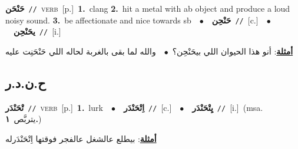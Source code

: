 \documentclass[10pt,a4paper,twoside]{article} %
\begin{document}
\begin{multicols}{2}
{\setlength\topsep{0pt}\textbf{\foreignlanguage{arabic}{حَنْحَن}}\ {\color{gray}\texttt{//}\color{black}}\ \textsc{verb}\ [p.]\ \textbf{1.}~clang  \textbf{2.}~hit a metal with ab object and produce a loud noisy sound.  \textbf{3.}~be affectionate and nice towards sb\ \ $\bullet$\ \ \setlength\topsep{0pt}\textbf{\foreignlanguage{arabic}{حَنْحِن}}\ {\color{gray}\texttt{//}\color{black}}\ [c.]\ \ $\bullet$\ \ \setlength\topsep{0pt}\textbf{\foreignlanguage{arabic}{يحَنْحِن}}\ {\color{gray}\texttt{//}\color{black}}\ [i.]\  \begin{flushright}\color{gray}\foreignlanguage{arabic}{\textbf{\underline{\foreignlanguage{arabic}{أمثلة}}}: أنو هذا الحيوان اللي بيحَنْحِن؟\ $\bullet$\ \  والله لما بقى بالغربة لحاله اللي حَنْحَنِت عليه}\end{flushright}\color{black}} \vspace{2mm}

\vspace{-3mm}
\subsection*{\color{blue}\foreignlanguage{arabic}{ح.ن.د.ر}\color{blue}{}} 

{\setlength\topsep{0pt}\textbf{\foreignlanguage{arabic}{تْحَنْدَر}}\ {\color{gray}\texttt{//}\color{black}}\ \textsc{verb}\ [p.]\ \textbf{1.}~lurk\ \ $\bullet$\ \ \setlength\topsep{0pt}\textbf{\foreignlanguage{arabic}{اِتْحَنْدَر}}\ {\color{gray}\texttt{//}\color{black}}\ [c.]\ \ $\bullet$\ \ \setlength\topsep{0pt}\textbf{\foreignlanguage{arabic}{يِتْحَنْدَر}}\ {\color{gray}\texttt{//}\color{black}}\ [i.]\ \color{gray}(msa. \foreignlanguage{arabic}{يتربَّص}~\foreignlanguage{arabic}{\textbf{١.}})\color{black}\  \begin{flushright}\color{gray}\foreignlanguage{arabic}{\textbf{\underline{\foreignlanguage{arabic}{أمثلة}}}: بيطلع عالشغل عالفجر فوقتها اِتْحَنْدَرله}\end{flushright}\color{black}} \vspace{2mm}


\end{multicols}
\end{document}
